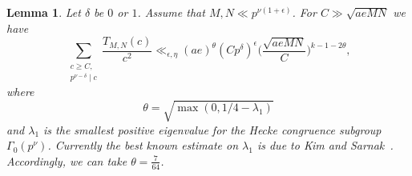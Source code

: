 \documentclass[12pt]{amsart}
\theoremstyle{plain}
\newtheorem{lem}{Lemma}[subsection]
\theoremstyle{definition}
\begin{document}
\begin{lem}\label{restrict C}
 Let $\delta$ be $0$ or $1$. Assume that $M, N \ll p^{\nu(1+\epsilon)}$. For $C \gg \sqrt{aeMN}$ we have 
      \[
    \sum_{\substack{c\geq C,\\ 
    p^{\nu-\delta} \mid c}} \frac{T_{M, N}(c)}{c^2}
    \ll_{\epsilon, \eta} 
     (ae)^\theta  \left(Cp^\delta\right)^{\epsilon}
    \bigg(\frac{\sqrt{aeMN}}{C}\bigg)^{k-1-2\theta},
    \]
where
\begin{equation}
\theta = \sqrt{\max(0, 1/4 - \lambda_1)} 
\end{equation}
and $\lambda_1$ is the smallest positive eigenvalue for the Hecke congruence subgroup $\Gamma_0(p^{\nu})$. Currently the best known estimate on $\lambda_1$ is due to Kim and Sarnak~\cite{Kim Sarnak}. Accordingly, we can take $\theta = \frac{7}{64}$.

\end{lem}
\end{document}
